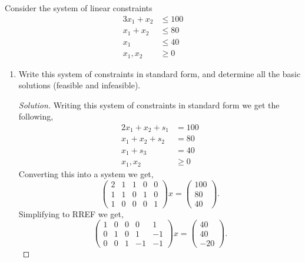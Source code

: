 \documentclass[12pt]{article}
\makeatletter
\theoremstyle{homework}
\newenvironment{exercise}[1]
{\def\@currentlabel{#1}\exercisecore}
{\endexercisecore}
\makeatother
\begin{document}
\begin{exercise}{3.1} Consider the system of linear constraints
  \begin{align*}
    3x_1 + x_2 &\leq 100\\
    x_1 + x_2 &\leq 80\\
    x_1 &\leq 40\\
    x_1, x_2 &\geq 0
  \end{align*}
  \begin{enumerate}
    \item[(i)] Write this system of constraints in standard form, and determine all the 
    basic solutions (feasible and infeasible).\\
    \begin{proof}[Solution] Writing this system of constraints in standard form we get the following, 
      \begin{align*}
        2x_1 + x_2 + s_1 &=100\\
        x_1 + x_2 + s_2 &= 80\\
        x_1  + s_3 &= 40\\
        x_1, x_2 &\geq 0
      \end{align*}
      Converting this into a system we get, 
      \begin{equation*}
        \begin{pmatrix}
          2 & 1 & 1 & 0 & 0 \\
          1 & 1 & 0 & 1 & 0 \\
          1 & 0 & 0 & 0 & 1 
        \end{pmatrix}
        x = 
        \begin{pmatrix}
          100\\
          80\\
          40
        \end{pmatrix}.
      \end{equation*}      
      Simplifying to RREF we get,
      \begin{equation*}
        \begin{pmatrix}1&0&0&0&1\\ 0&1&0&1&-1\\ 0&0&1&-1&-1\end{pmatrix}
        x
         =         
         \begin{pmatrix}
          40\\
          40\\
          -20
        \end{pmatrix}.
      \end{equation*}

\end{proof}
\end{enumerate}
\end{exercise}
\end{document}
